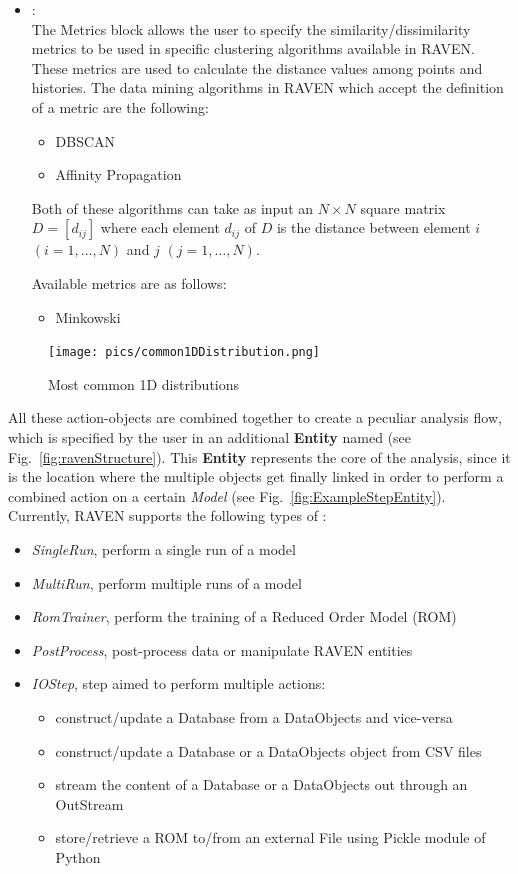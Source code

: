 \begin{itemize}
\begin{itemize}
    \end{itemize}
  \item \textit{}:
   \\
    The Metrics block allows the user to specify the similarity/dissimilarity metrics to be used in specific clustering algorithms available in RAVEN.
    These metrics are used to calculate the distance values among points and histories.
    The data mining algorithms in RAVEN which accept the definition of a metric are the following:
    \begin{itemize}
      \item DBSCAN 
      \item Affinity Propagation 
    \end{itemize}
    Both of these algorithms can take as input an $N \times N$ square matrix $D=[d_{ij}]$ where each element $d_{ij}$ of $D$ is the distance between 
    element $i$ $(i=1,\ldots,N)$ and $j$
    $(j=1,\ldots,N)$.

    Available metrics are as follows:
    \begin{itemize}
      \item Minkowski
    \end{itemize}
\end{itemize}
\begin{figure}[h!]
  \texttt{[image: pics/common1DDistribution.png]}
  \caption{Most common 1D distributions}
  \label{fig:commonDist}
\end{figure}
All these action-objects are combined together to create a peculiar analysis flow, which is specified
by the user in an additional \textbf{Entity} named \textit{} (see Fig.~\ref{fig:ravenStructure}).
This \textbf{Entity} represents the core of the analysis, since it is the location where the multiple objects get
finally linked in order to perform a combined action on a certain \textit{Model} (see Fig.~\ref{fig:ExampleStepEntity}).
Currently, RAVEN supports the following types of \textit{}:
\begin{itemize}
  \item \textit{SingleRun}, perform a single run of a model
  \item \textit{MultiRun}, perform multiple runs of a model
  \item \textit{RomTrainer}, perform the training of a Reduced Order Model (ROM)
  \item \textit{PostProcess}, post-process data or manipulate RAVEN entities
  \item \textit{IOStep}, step aimed to perform multiple actions:
  \begin{itemize}
    \item construct/update a Database from a DataObjects and vice-versa
    \item construct/update a Database or a DataObjects object from CSV files
    \item stream the content of a Database or a DataObjects out through an OutStream
    \item store/retrieve a ROM to/from an external File using Pickle module of Python
  \end{itemize}
\end{itemize}

